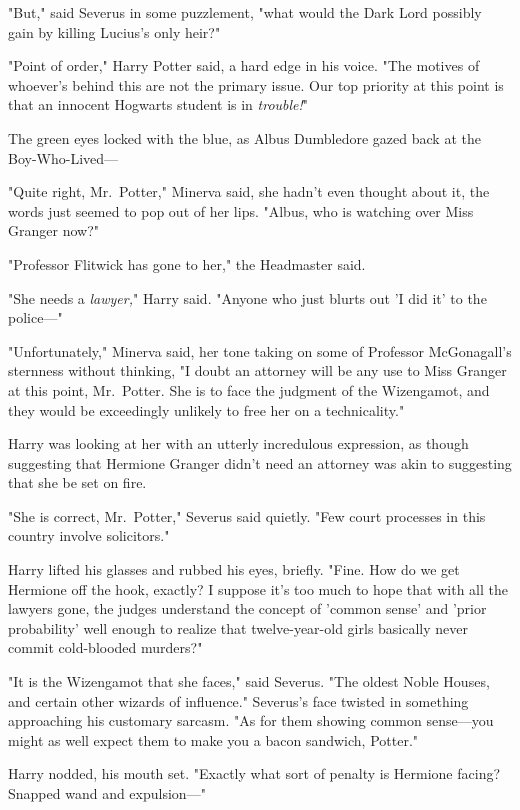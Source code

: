 "But," said Severus in some puzzlement, "what would the Dark Lord possibly gain 
by killing Lucius's only heir?"

"Point of order," Harry Potter said, a hard edge in his voice. "The motives of 
whoever's behind this are not the primary issue. Our top priority at this point 
is that an innocent Hogwarts student is in \emph{trouble!}"

The green eyes locked with the blue, as Albus Dumbledore gazed back at the 
Boy-Who-Lived---

"Quite right, Mr.~Potter," Minerva said, she hadn't even thought about it, the 
words just seemed to pop out of her lips. "Albus, who is watching over Miss 
Granger now?"

"Professor Flitwick has gone to her," the Headmaster said.

"She needs a \emph{lawyer,}" Harry said. "Anyone who just blurts out 'I did it' 
to the police---"

"Unfortunately," Minerva said, her tone taking on some of Professor 
McGonagall's sternness without thinking, "I doubt an attorney will be any use 
to Miss Granger at this point, Mr.~Potter. She is to face the judgment of the 
Wizengamot, and they would be exceedingly unlikely to free her on a 
technicality."

Harry was looking at her with an utterly incredulous expression, as though 
suggesting that Hermione Granger didn't need an attorney was akin to suggesting 
that she be set on fire.

"She is correct, Mr.~Potter," Severus said quietly. "Few court processes in 
this country involve solicitors."

Harry lifted his glasses and rubbed his eyes, briefly. "Fine. How do we get 
Hermione off the hook, exactly? I suppose it's too much to hope that with all 
the lawyers gone, the judges understand the concept of 'common sense' and 
'prior probability' well enough to realize that twelve-year-old girls basically 
never commit cold-blooded murders?"

"It is the Wizengamot that she faces," said Severus. "The oldest Noble Houses, 
and certain other wizards of influence." Severus's face twisted in something 
approaching his customary sarcasm. "As for them showing common sense---you 
might as well expect them to make you a bacon sandwich, Potter."

Harry nodded, his mouth set. "Exactly what sort of penalty is Hermione facing? 
Snapped wand and expulsion---"

